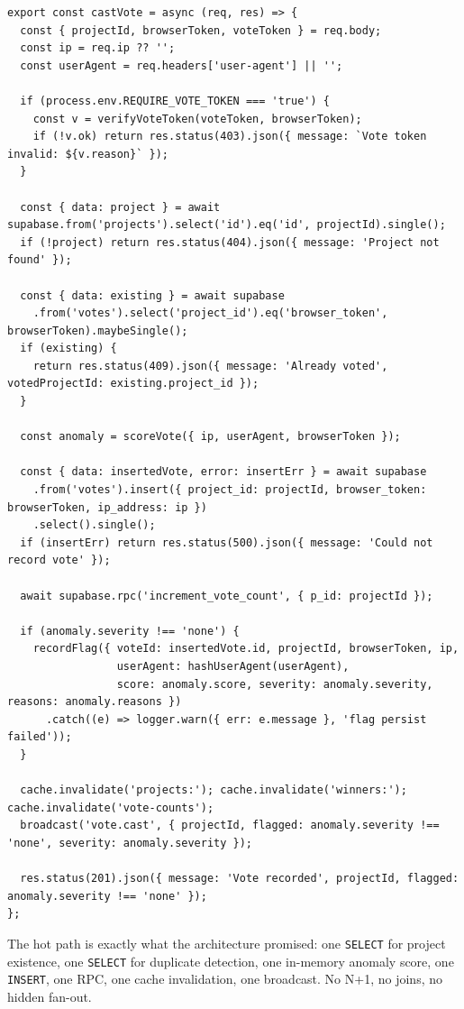 \begin{lstlisting}[caption={\texttt{server/controllers/voteController.js} (castVote, abridged)},label={lst:cast}]
export const castVote = async (req, res) => {
  const { projectId, browserToken, voteToken } = req.body;
  const ip = req.ip ?? '';
  const userAgent = req.headers['user-agent'] || '';

  if (process.env.REQUIRE_VOTE_TOKEN === 'true') {
    const v = verifyVoteToken(voteToken, browserToken);
    if (!v.ok) return res.status(403).json({ message: `Vote token invalid: ${v.reason}` });
  }

  const { data: project } = await supabase.from('projects').select('id').eq('id', projectId).single();
  if (!project) return res.status(404).json({ message: 'Project not found' });

  const { data: existing } = await supabase
    .from('votes').select('project_id').eq('browser_token', browserToken).maybeSingle();
  if (existing) {
    return res.status(409).json({ message: 'Already voted', votedProjectId: existing.project_id });
  }

  const anomaly = scoreVote({ ip, userAgent, browserToken });

  const { data: insertedVote, error: insertErr } = await supabase
    .from('votes').insert({ project_id: projectId, browser_token: browserToken, ip_address: ip })
    .select().single();
  if (insertErr) return res.status(500).json({ message: 'Could not record vote' });

  await supabase.rpc('increment_vote_count', { p_id: projectId });

  if (anomaly.severity !== 'none') {
    recordFlag({ voteId: insertedVote.id, projectId, browserToken, ip,
                 userAgent: hashUserAgent(userAgent),
                 score: anomaly.score, severity: anomaly.severity, reasons: anomaly.reasons })
      .catch((e) => logger.warn({ err: e.message }, 'flag persist failed'));
  }

  cache.invalidate('projects:'); cache.invalidate('winners:'); cache.invalidate('vote-counts');
  broadcast('vote.cast', { projectId, flagged: anomaly.severity !== 'none', severity: anomaly.severity });

  res.status(201).json({ message: 'Vote recorded', projectId, flagged: anomaly.severity !== 'none' });
};
\end{lstlisting}

The hot path is exactly what the architecture promised: one
\texttt{SELECT} for project existence, one \texttt{SELECT} for duplicate
detection, one in-memory anomaly score, one \texttt{INSERT}, one RPC,
one cache invalidation, one broadcast. No N+1, no joins, no hidden
fan-out.

